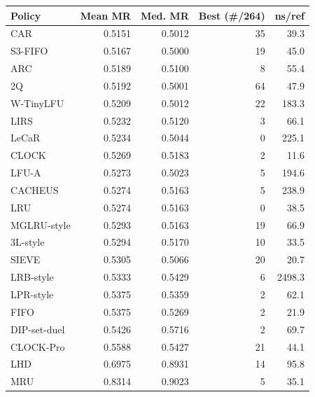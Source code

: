 \begin{tabular}{lrrrr}
\toprule
Policy & Mean MR & Med. MR & Best (\#/264) & ns/ref \\
\midrule
CAR & 0.5151 & 0.5012 & 35 & 39.3 \\
S3-FIFO & 0.5167 & 0.5000 & 19 & 45.0 \\
ARC & 0.5189 & 0.5100 & 8 & 55.4 \\
2Q & 0.5192 & 0.5001 & 64 & 47.9 \\
W-TinyLFU & 0.5209 & 0.5012 & 22 & 183.3 \\
LIRS & 0.5232 & 0.5120 & 3 & 66.1 \\
LeCaR & 0.5234 & 0.5044 & 0 & 225.1 \\
CLOCK & 0.5269 & 0.5183 & 2 & 11.6 \\
LFU-A & 0.5273 & 0.5023 & 5 & 194.6 \\
CACHEUS & 0.5274 & 0.5163 & 5 & 238.9 \\
LRU & 0.5274 & 0.5163 & 0 & 38.5 \\
MGLRU-style & 0.5293 & 0.5163 & 19 & 66.9 \\
3L-style & 0.5294 & 0.5170 & 10 & 33.5 \\
SIEVE & 0.5305 & 0.5066 & 20 & 20.7 \\
LRB-style & 0.5333 & 0.5429 & 6 & 2498.3 \\
LPR-style & 0.5375 & 0.5359 & 2 & 62.1 \\
FIFO & 0.5375 & 0.5269 & 2 & 21.9 \\
DIP-set-duel & 0.5426 & 0.5716 & 2 & 69.7 \\
CLOCK-Pro & 0.5588 & 0.5427 & 21 & 44.1 \\
LHD & 0.6975 & 0.8931 & 14 & 95.8 \\
MRU & 0.8314 & 0.9023 & 5 & 35.1 \\
\bottomrule
\end{tabular}
